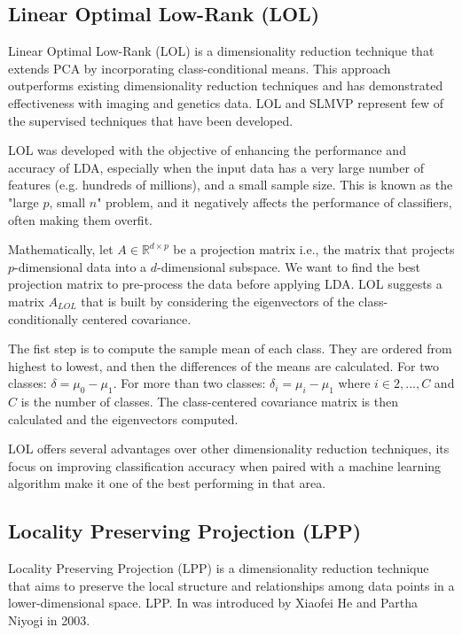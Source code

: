 \subsection{Linear Optimal Low-Rank (LOL)}

Linear Optimal Low-Rank (LOL) is a dimensionality reduction technique that extends PCA by incorporating class-conditional means. This approach outperforms existing dimensionality reduction techniques and has demonstrated effectiveness with imaging and genetics data. LOL and SLMVP represent few of the supervised techniques that have been developed.

LOL was developed with the objective of enhancing the performance and accuracy of LDA, especially when the input data has a very large number of features (e.g. hundreds of millions), and a small sample size. This is known as the "large $p$, small $n$" problem, and it negatively affects the performance of classifiers, often making them overfit.

Mathematically, let $A \in \mathbb{R}^{d \times p}$ be a projection matrix i.e., the matrix that projects $p$-dimensional data into a $d$-dimensional subspace. We want to find the best projection matrix to pre-process the data before applying LDA. LOL suggests a matrix $A_{LOL}$ that is built by considering the eigenvectors of the class-conditionally centered covariance.

The fist step is to compute the sample mean of each class. They are ordered from highest to lowest, and then the differences of the means are calculated. For two classes: $\delta = \mu_0 - \mu_1$. For more than two classes: $\delta_i = \mu_i - \mu_1$ where $i \in {2,...,C}$ and $C$ is the number of classes. The class-centered covariance matrix is then calculated and the eigenvectors computed.

LOL offers several advantages over other dimensionality reduction techniques, its focus on improving classification accuracy when paired with a machine learning algorithm make it one of the best performing in that area.

\subsection{Locality Preserving Projection (LPP)}

Locality Preserving Projection (LPP) is a dimensionality reduction technique that aims to preserve the local structure and relationships among data points in a lower-dimensional space. LPP. In was introduced by Xiaofei He and Partha Niyogi in 2003.

